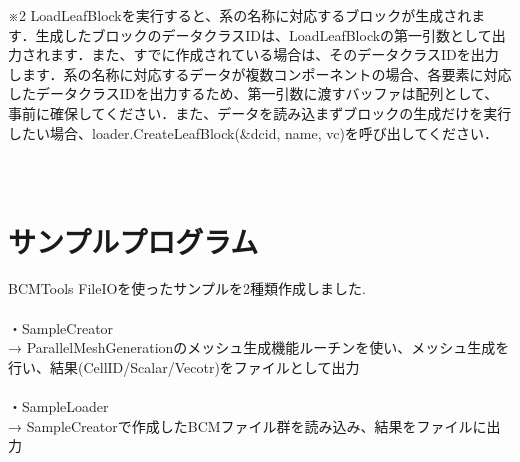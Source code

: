 \documentclass[twoside]{jbook}
\begin{document}
※2 LoadLeafBlockを実行すると、系の名称に対応するブロックが生成されます．生成したブロックのデータクラスIDは、LoadLeafBlockの第一引数として出力されます．また、すでに作成されている場合は、そのデータクラスIDを出力します．系の名称に対応するデータが複数コンポーネントの場合、各要素に対応したデータクラスIDを出力するため、第一引数に渡すバッファは配列として、事前に確保してください．また、データを読み込まずブロックの生成だけを実行したい場合、loader.CreateLeafBlock(\&dcid, name, vc)を呼び出してください． \\
 \\
 \\
\section{サンプルプログラム}
BCMTools FileIOを使ったサンプルを2種類作成しました.  \\
 \\
・SampleCreator \\
  → ParallelMeshGenerationのメッシュ生成機能ルーチンを使い、メッシュ生成を行い、結果(CellID/Scalar/Vecotr)をファイルとして出力 \\
 \\
・SampleLoader \\
  → SampleCreatorで作成したBCMファイル群を読み込み、結果をファイルに出力 \\
\end{document}
